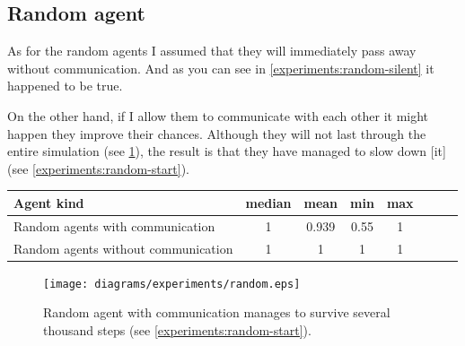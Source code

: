 \subsection{Random agent}   

As for the random agents I assumed that they will immediately pass away without communication. And as you can see in \ref{experiments:random-silent} it happened to be true. 

On the other hand, if I allow them to communicate with each other it might happen they improve their chances. Although they will not last through the entire simulation (see \ref{experiments:gng-grid-pr-random}), the result is that they have managed to slow down [it] (see \ref{experiments:random-start}).

\begin{center}   
  \begin{tabular}{l*{6}{c}r}
  Agent kind        & median & mean & min & max \\
  \hline  
  Random agents with communication     & 1 & 0.939 & 0.55 & 1  \\
  Random agents without communication    & 1 & 1 & 1 & 1  \\
  \end{tabular}                  
\end{center}


\begin{figure}[h!]
  \centering                                
  \texttt{[image: diagrams/experiments/random.eps]}    
  \caption{Random agent with communication manages to survive several thousand steps (see \ref{experiments:random-start}).}
  \label{experiments:gng-grid-pr-random}
\end{figure}             

